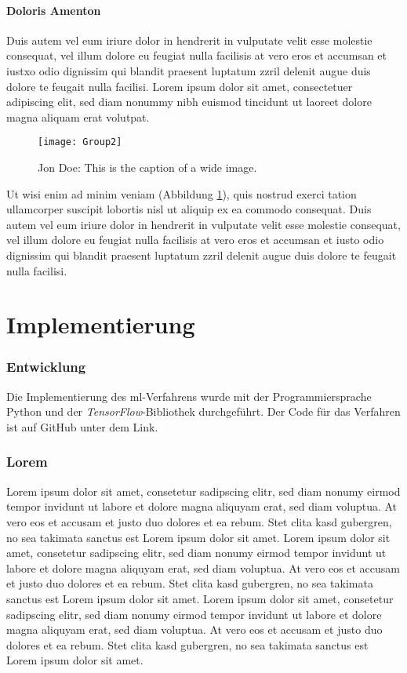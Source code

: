 \documentclass[9pt,a4paper,ngerman]{extarticle}
\begin{document}
\subsection{Doloris Amenton}
Duis autem vel eum iriure dolor in hendrerit in vulputate velit esse molestie consequat, vel illum dolore eu feugiat nulla facilisis at vero eros et accumsan et iustxo odio dignissim qui blandit praesent luptatum zzril delenit augue duis dolore te feugait nulla facilisi. Lorem ipsum dolor sit amet, consectetuer adipiscing elit, sed diam nonummy nibh euismod tincidunt ut laoreet dolore magna aliquam erat volutpat.   

\begin{figure}
	\texttt{[image: Group2]}
	\caption{Jon Doe: This is the caption of a wide image.}
	\label{fig:image-b}
\end{figure}

Ut wisi enim ad minim veniam (Abbildung \ref{fig:image-b}), quis nostrud exerci tation ullamcorper suscipit lobortis nisl ut aliquip ex ea commodo consequat. Duis autem vel eum iriure dolor in hendrerit in vulputate velit esse molestie consequat, vel illum dolore eu feugiat nulla facilisis at vero eros et accumsan et iusto odio dignissim qui blandit praesent luptatum zzril delenit augue duis dolore te feugait nulla facilisi. 

\clearpage

\part{Implementierung}\label{sec:implementierung}

\section{Entwicklung}
Die Implementierung des \gls{ml}-Verfahrens wurde mit der Programmiersprache Python und der \textit{TensorFlow}-Bibliothek durchgeführt. Der Code für das Verfahren ist auf GitHub unter dem Link.

\section{Lorem}
Lorem ipsum dolor sit amet, consetetur sadipscing elitr, sed diam nonumy eirmod tempor invidunt ut labore et dolore magna aliquyam erat, sed diam voluptua. At vero eos et accusam et justo duo dolores et ea rebum. Stet clita kasd gubergren, no sea takimata sanctus est Lorem ipsum dolor sit amet. Lorem ipsum dolor sit amet, consetetur sadipscing elitr, sed diam nonumy eirmod tempor invidunt ut labore et dolore magna aliquyam erat, sed diam voluptua. At vero eos et accusam et justo duo dolores et ea rebum. Stet clita kasd gubergren, no sea takimata sanctus est Lorem ipsum dolor sit amet. Lorem ipsum dolor sit amet, consetetur sadipscing elitr, sed diam nonumy eirmod tempor invidunt ut labore et dolore magna aliquyam erat, sed diam voluptua. At vero eos et accusam et justo duo dolores et ea rebum. Stet clita kasd gubergren, no sea takimata sanctus est Lorem ipsum dolor sit amet.   
\end{document}
